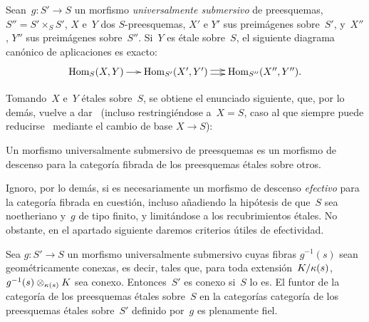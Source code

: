 \begin{proposition}
\label{IX.3.2}
Sean~$g\colon S'\to S$ un morfismo \emph{universalmente submersivo} de
preesquemas, $S''=S'\times_S S'$, $X$ e~$Y$ dos $S$-preesquemas, $X'$ e
$Y'$ sus preimágenes sobre~$S'$, y~$X''$, $Y''$ sus preimágenes
sobre~$S''$. Si~$Y$ es étale sobre~$S$, el siguiente diagrama canónico de
aplicaciones es exacto:
$$
\xymatrix@C=.5cm{ {\Hom_S(X,Y)} \ar[r] & {\Hom_{S'}(X',Y')}
\ar@/^2pt/[r]\ar@/_2pt/[r] & {\Hom_{S''}(X'',Y'')}. }
$$
\end{proposition}

Tomando~$X$ e~$Y$ étales sobre~$S$, se obtiene el enunciado siguiente, que,
por lo demás, vuelve a dar~ (incluso restringiéndose a~$X=S$,
caso al que siempre puede reducirse~ mediante el cambio de base
$X\to S$):

\begin{corollaire}
\label{IX.3.3}
Un morfismo universalmente submersivo de preesquemas es un morfismo de
descenso para la categoría fibrada de los preesquemas étales sobre otros.
\end{corollaire}

Ignoro, por lo demás, si es necesariamente un morfismo de descenso
\emph{efectivo} para la categoría fibrada en cuestión, incluso añadiendo la
hipótesis de que~$S$ sea noetheriano y~$g$ de tipo finito, y limitándose a
los recubrimientos étales. No obstante, en el apartado siguiente daremos
criterios útiles de efectividad.

\begin{corollaire}
\label{IX.3.4}
Sea
$g\colon S'\to S$ un morfismo universalmente submersivo cuyas fibras
$g^{-1}(s)$ sean \og geométricamente conexas\fg,
%
es decir, tales que, para toda extensión~$K/\kappa(s)$,
$g^{-1}(s)\otimes_{\kappa(s)}K$ sea conexo. Entonces~$S'$ es conexo si~$S$
lo es. El funtor de la categoría de los preesquemas étales sobre~$S$ en la
{categorías}
{categoría}
de los preesquemas étales sobre~$S'$ definido por~$g$ es plenamente fiel.
\end{corollaire}


